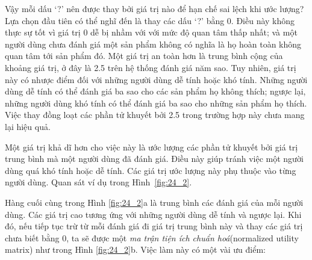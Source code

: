 Vậy mỗi dấu `?' nên được thay bởi giá trị nào để hạn chế sai lệch khi ước lượng? Lựa chọn đầu tiên có thể nghĩ đến là thay các dấu `?' bằng 0. Điều
này không thực sự tốt vì giá trị 0 dễ bị nhầm với với mức độ quan tâm thấp nhất; và
một người dùng chưa đánh giá một sản phẩm không có nghĩa là họ hoàn toàn không
quan tâm tới sản phẩm đó. Một giá trị {an toàn} hơn là trung bình cộng của khoảng giá trị, ở đây là 2.5 trên hệ thống đánh giá năm sao. Tuy nhiên, giá trị này có
nhược điểm đối với những người dùng {dễ tính} hoặc {khó tính}. Những 
người dùng dễ tính có thể đánh giá ba sao cho các sản phẩm họ không thích;
ngược lại, những người dùng khó tính có thể đánh giá ba sao cho
những sản phẩm họ thích. Việc thay đồng loạt các phần tử khuyết bởi 2.5 trong
trường hợp này chưa mang lại hiệu quả. 

Một giá trị khả dĩ hơn cho việc này là ước lượng các phần tử khuyết bởi giá
trị trung bình mà một người dùng đã đánh giá. Điều này giúp tránh việc một
người dùng quá khó tính hoặc dễ tính. Các giá trị ước lượng này phụ thuộc
vào từng
người dùng. Quan sát ví dụ trong Hình~\ref{fig:24_2}.

Hàng cuối cùng trong Hình \ref{fig:24_2}a là trung bình các đánh giá của mỗi
người dùng. Các giá trị cao tương ứng với những người dùng dễ tính và ngược lại. Khi đó, nếu tiếp tục trừ từ mỗi đánh giá đi giá trị trung bình này và thay các giá trị chưa biết bằng 0,
ta sẽ được một \textit{ma trận tiện ích chuẩn hoá}({normalized utility
matrix}) như trong Hình \ref{fig:24_2}b. Việc làm này có một vài ưu điểm:

